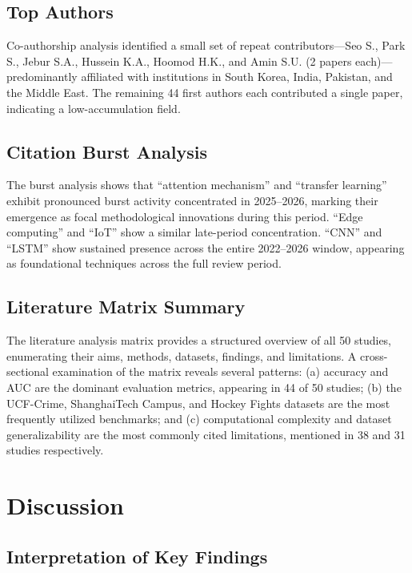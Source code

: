 \documentclass[conference]{IEEEtran}
\begin{document}
\subsection{Top Authors}

Co-authorship analysis identified a small set of repeat contributors---Seo S., Park S., Jebur S.A., Hussein K.A., Hoomod H.K., and Amin S.U. (2 papers each)---predominantly affiliated with institutions in South Korea, India, Pakistan, and the Middle East. The remaining 44 first authors each contributed a single paper, indicating a low-accumulation field.

\subsection{Citation Burst Analysis}

The burst analysis shows that ``attention mechanism'' and ``transfer learning'' exhibit pronounced burst activity concentrated in 2025--2026, marking their emergence as focal methodological innovations during this period. ``Edge computing'' and ``IoT'' show a similar late-period concentration. ``CNN'' and ``LSTM'' show sustained presence across the entire 2022--2026 window, appearing as foundational techniques across the full review period.

\subsection{Literature Matrix Summary}

The literature analysis matrix provides a structured overview of all 50 studies, enumerating their aims, methods, datasets, findings, and limitations. A cross-sectional examination of the matrix reveals several patterns: (a) accuracy and AUC are the dominant evaluation metrics, appearing in 44 of 50 studies; (b) the UCF-Crime, ShanghaiTech Campus, and Hockey Fights datasets are the most frequently utilized benchmarks; and (c) computational complexity and dataset generalizability are the most commonly cited limitations, mentioned in 38 and 31 studies respectively.

\section{Discussion}

\subsection{Interpretation of Key Findings}
\end{document}
